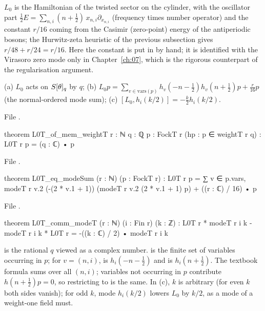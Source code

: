 \begin{physics}
$L_0$ is the Hamiltonian of the twisted sector on the cylinder, with the oscillator part $\tfrac12E=\sum_{n,i}(n+\tfrac12)\,x_{n,i}\partial_{x_{n,i}}$ (frequency times number operator) and the constant $r/16$ coming from the Casimir (zero-point) energy of the antiperiodic bosons; the Hurwitz-zeta heuristic of the previous subsection gives $r/48+r/24=r/16$. Here the constant is put in by hand; it is identified with the Virasoro zero mode only in Chapter~\ref{ch:07}, which is the rigorous counterpart of the regularisation argument.
\end{physics}
\begin{theorem}\label{ch06:thm:L0T}
(a) $L_0$ acts on $S[\theta]_q$ by $q$; (b) $L_0p=\sum_{v\in\mathrm{vars}(p)}h_v(-n-\tfrac12)
h_v(n+\tfrac12)p+\frac r{16}p$ (the normal-ordered mode sum); (c) $[L_0,h_i(k/2)]=-\frac k2h_i(k/2)$.
\end{theorem}
\noindent File .
\begin{leancode}
theorem L0T_of_mem_weightT {r : ℕ} {q : ℚ} {p : FockT r} (hp : p ∈ weightT r q) :
    L0T r p = (q : ℂ) • p
\end{leancode}
\noindent File .
\begin{leancode}
theorem L0T_eq_modeSum (r : ℕ) (p : FockT r) :
    L0T r p = ∑ v ∈ p.vars, modeT r v.2 (-(2 * v.1 + 1)) (modeT r v.2 (2 * v.1 + 1) p)
      + ((r : ℂ) / 16) • p
\end{leancode}
\noindent File .
\begin{leancode}
theorem L0T_comm_modeT (r : ℕ) (i : Fin r) (k : ℤ) :
    L0T r * modeT r i k - modeT r i k * L0T r = -((k : ℂ) / 2) • modeT r i k
\end{leancode}
\begin{dictionary}
 is the rational $q$ viewed as a complex number.   is the finite set of
variables occurring in $p$; for $v=(n,i)$,  is $h_i(-n-\frac12)$
and  is $h_i(n+\frac12)$.  The textbook formula sums over all
$(n,i)$; variables not occurring in $p$ contribute $h(n+\frac12)p=0$, so restricting to
 is the same.  In (c), $k$ is arbitrary (for even $k$ both sides vanish); for odd $k$,
mode $h_i(k/2)$ lowers $L_0$ by $k/2$, as a mode of a weight-one field must.
\end{dictionary}

